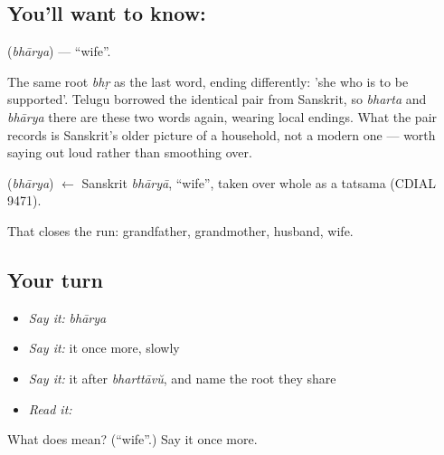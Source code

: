 \subsection*{You'll want to know: }
\textbf{} (\emph{bhārya}) — \textquotedblleft{}wife\textquotedblright{}.

The same root \emph{bhṛ} as the last word, ending differently: 'she who is to be supported'. Telugu borrowed the identical pair from Sanskrit, so \emph{bharta} and \emph{bhārya} there are these two words again, wearing local endings. What the pair records is Sanskrit's older picture of a household, not a modern one — worth saying out loud rather than smoothing over.

\begin{cousinweb}
\textbf{} (\emph{bhārya}) $\leftarrow$ Sanskrit \emph{bhāryā}, \textquotedblleft{}wife\textquotedblright{}, taken over whole as a tatsama (CDIAL 9471).
\end{cousinweb}

\begin{grammarlens}[title={What you've built}]
That closes the run: grandfather, grandmother, husband, wife.
\end{grammarlens}

\subsection*{Your turn}
\begin{itemize}
\raggedright
  \item \emph{Say it:} \emph{bhārya}
  \item \emph{Say it:} it once more, slowly
  \item \emph{Say it:} it after \emph{bharttāvŭ}, and name the root they share
  \item \emph{Read it:} \textbf{}
\end{itemize}

\begin{tcolorbox}[breakable,colback=teal!4,colframe=teal!35!black,title={Before you move on}]
What does  mean? (\textquotedblleft{}wife\textquotedblright{}.) Say it once more.
\end{tcolorbox}
